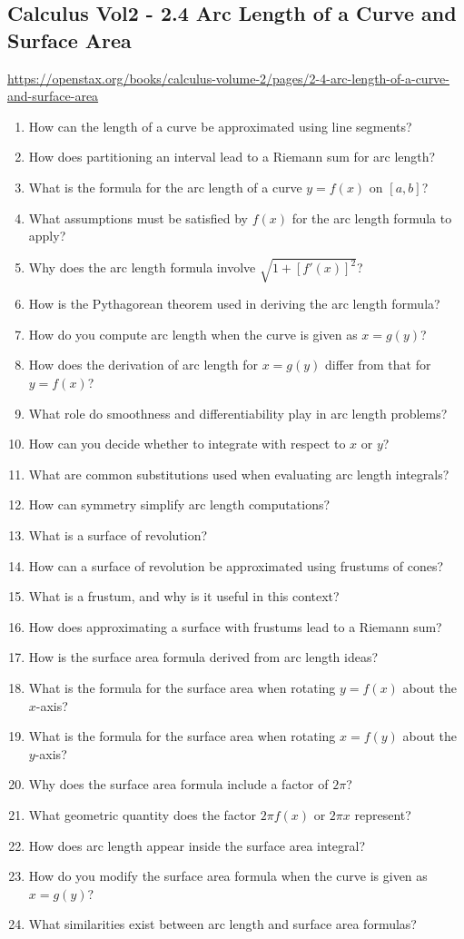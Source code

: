 \subsection{Calculus Vol2 - 2.4 Arc Length of a Curve and Surface Area}

\url{https://openstax.org/books/calculus-volume-2/pages/2-4-arc-length-of-a-curve-and-surface-area}

\begin{enumerate}
  \item How can the length of a curve be approximated using line segments?
  \item How does partitioning an interval lead to a Riemann sum for arc length?
  \item What is the formula for the arc length of a curve $y=f(x)$ on $[a,b]$?
  \item What assumptions must be satisfied by $f(x)$ for the arc length formula to apply?
  \item Why does the arc length formula involve $\sqrt{1+[f'(x)]^2}$?
  \item How is the Pythagorean theorem used in deriving the arc length formula?
  \item How do you compute arc length when the curve is given as $x=g(y)$?
  \item How does the derivation of arc length for $x=g(y)$ differ from that for $y=f(x)$?
  \item What role do smoothness and differentiability play in arc length problems?
  \item How can you decide whether to integrate with respect to $x$ or $y$?
  \item What are common substitutions used when evaluating arc length integrals?
  \item How can symmetry simplify arc length computations?
  \item What is a surface of revolution?
  \item How can a surface of revolution be approximated using frustums of cones?
  \item What is a frustum, and why is it useful in this context?
  \item How does approximating a surface with frustums lead to a Riemann sum?
  \item How is the surface area formula derived from arc length ideas?
  \item What is the formula for the surface area when rotating $y=f(x)$ about the $x$-axis?
  \item What is the formula for the surface area when rotating $x=f(y)$ about the $y$-axis?
  \item Why does the surface area formula include a factor of $2\pi$?
  \item What geometric quantity does the factor $2\pi f(x)$ or $2\pi x$ represent?
  \item How does arc length appear inside the surface area integral?
  \item How do you modify the surface area formula when the curve is given as $x=g(y)$?
  \item What similarities exist between arc length and surface area formulas?
\end{enumerate}
